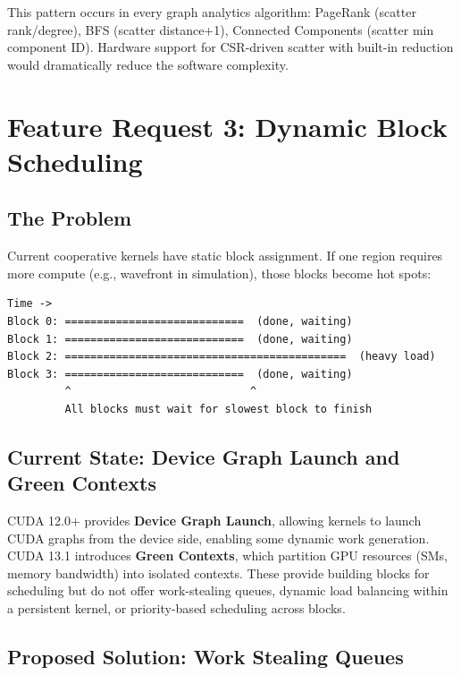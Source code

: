 \documentclass[11pt,a4paper]{article}
\begin{document}
This pattern occurs in every graph analytics algorithm: PageRank (scatter rank/degree), BFS (scatter distance+1), Connected Components (scatter min component ID). Hardware support for CSR-driven scatter with built-in reduction would dramatically reduce the software complexity.

\newpage

\section{Feature Request 3: Dynamic Block Scheduling}

\subsection{The Problem}

Current cooperative kernels have static block assignment. If one region requires more compute (e.g., wavefront in simulation), those blocks become hot spots:

\begin{Verbatim}[fontsize=\small,frame=single,framesep=3mm]
Time ->
Block 0: ============================  (done, waiting)
Block 1: ============================  (done, waiting)
Block 2: ============================================  (heavy load)
Block 3: ============================  (done, waiting)
         ^                            ^
         All blocks must wait for slowest block to finish
\end{Verbatim}

\subsection{Current State: Device Graph Launch and Green Contexts}

CUDA 12.0+ provides \textbf{Device Graph Launch}, allowing kernels to launch CUDA graphs from the device side, enabling some dynamic work generation. CUDA 13.1 introduces \textbf{Green Contexts}, which partition GPU resources (SMs, memory bandwidth) into isolated contexts. These provide building blocks for scheduling but do not offer work-stealing queues, dynamic load balancing within a persistent kernel, or priority-based scheduling across blocks.

\subsection{Proposed Solution: Work Stealing Queues}
\end{document}
